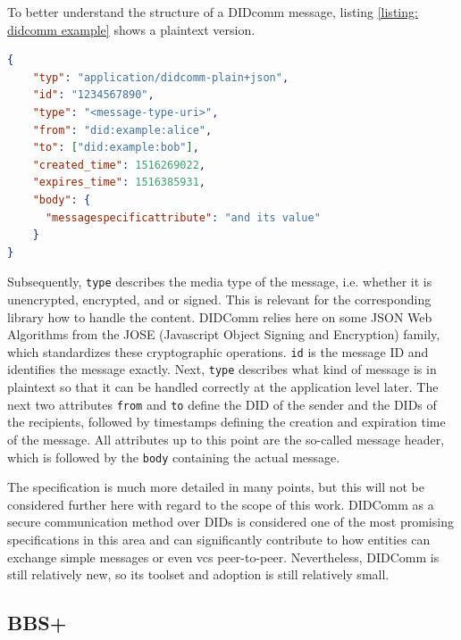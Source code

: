 		To better understand the structure of a DIDcomm message, listing \ref{listing: didcomm example} shows a plaintext version.
		\newline
		
		        \begin{lstlisting}[language=json, caption={Plaintext DIDComm message extracted from \cite{hardman_didcomm_2021}}, captionpos=b, label={listing: didcomm example}]  
{
    "typ": "application/didcomm-plain+json",
    "id": "1234567890",
    "type": "<message-type-uri>",
    "from": "did:example:alice",
    "to": ["did:example:bob"],
    "created_time": 1516269022,
    "expires_time": 1516385931,
    "body": {
      "messagespecificattribute": "and its value"
    }
}\end{lstlisting}

        Subsequently, \texttt{type} describes the media type of the message, i.e. whether it is unencrypted, encrypted, and or signed. This is relevant for the corresponding library how to handle the content. DIDComm relies here on some JSON Web Algorithms from the JOSE (Javascript Object Signing and Encryption) family, which standardizes these cryptographic operations. \texttt{id} is the message ID and identifies the message exactly. Next, \texttt{type} describes what kind of message is in plaintext so that it can be handled correctly at the application level later. The next two attributes \texttt{from} and \texttt{to} define the \ac{DID} of the sender and the \acp{DID} of the recipients, followed by timestamps defining the creation and expiration time of the message. All attributes up to this point are the so-called message header, which is followed by the \texttt{body} containing the actual message. \cite{hardman_didcomm_2021}
        
        The specification is much more detailed in many points, but this will not be considered further here with regard to the scope of this work. DIDComm as a secure communication method over \acp{DID} is considered one of the most promising specifications in this area \cite[p. 97]{preukschat_self-sovereign_2021} and can significantly contribute to how entities can exchange simple messages or even \acp{vc} peer-to-peer. Nevertheless, DIDComm is still relatively new, so its toolset and adoption is still relatively small.
		
		\subsection{BBS+}
		
